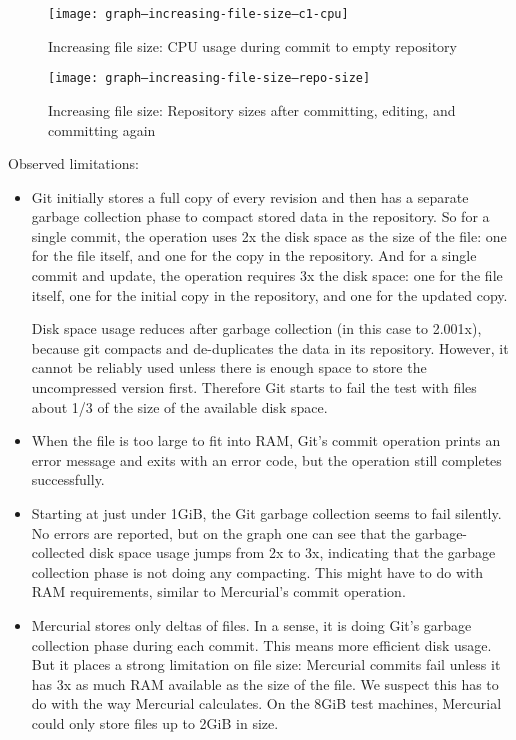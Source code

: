 \documentclass[a4paper]{article}
\begin{document}
\begin{figure}[h]
  \caption{Increasing file size: CPU usage during commit to empty repository}
  \label{fig:graph--increasing-file-size--c1-cpu}
  \centering
    \texttt{[image: graph--increasing-file-size--c1-cpu]}
\end{figure}

\begin{figure}[h]
  \caption{Increasing file size: Repository sizes after committing, editing, and
  committing again}
  \label{fig:graph--increasing-file-size--repo-size}
  \centering
    \texttt{[image: graph--increasing-file-size--repo-size]}
\end{figure}

Observed limitations:

\begin{itemize}

    \item Git initially stores a full copy of every revision and then has a
        separate garbage collection phase to compact stored data in the
        repository. So for a single commit, the operation uses 2x the disk space
        as the size of the file: one for the file itself, and one for the copy
        in the repository. And for a single commit and update, the operation
        requires 3x the disk space: one for the file itself, one for the initial
        copy in the repository, and one for the updated copy.

        Disk space usage reduces after garbage collection (in this case to
        2.001x), because git compacts and de-duplicates the data in its
        repository. However, it cannot be reliably used unless there is enough
        space to store the uncompressed version first. Therefore Git starts to
        fail the test with files about 1/3 of the size of the available disk
        space.

    \item When the file is too large to fit into RAM, Git's commit operation
        prints an error message and exits with an error code, but the operation
        still completes successfully.

    \item Starting at just under 1GiB, the Git garbage collection seems to fail
        silently. No errors are reported, but on the graph one can see that the
        garbage-collected disk space usage jumps from 2x to 3x, indicating that
        the garbage collection phase is not doing any compacting. This might
        have to do with RAM requirements, similar to Mercurial's commit
        operation.

    \item Mercurial stores only deltas of files. In a sense, it is doing Git's
        garbage collection phase during each commit. This means more efficient
        disk usage. But it places a strong limitation on file size: Mercurial
        commits fail unless it has 3x as much RAM available as the size of the
        file. We suspect this has to do with the way Mercurial calculates. On
        the 8GiB test machines, Mercurial could only store files up to 2GiB in
        size.

\end{itemize}
\end{document}
